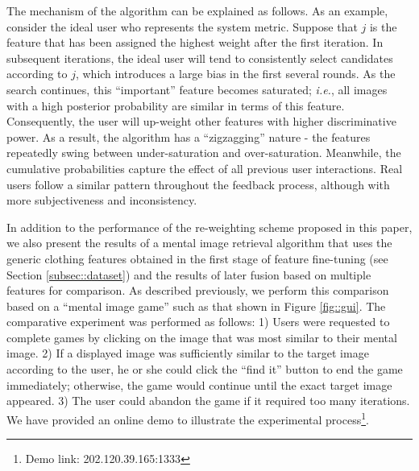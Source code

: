 \documentclass[journal]{IEEEtran}
\begin{document}
The mechanism of the algorithm can be explained as follows. As an example, consider the ideal user who represents the system metric. Suppose that $j$ is the feature that has been assigned the highest weight after the first iteration. In subsequent iterations, the ideal user will tend to consistently select candidates according to $j$, which introduces a large bias in the first several rounds. As the search continues, this ``important'' feature becomes saturated; \textit{i.e.}, all images with a high posterior probability are similar in terms of this feature. Consequently, the user will up-weight other features with higher discriminative power. As a result, the algorithm has a ``zigzagging'' nature - the features repeatedly swing between under-saturation and over-saturation. Meanwhile, the cumulative probabilities capture the effect of all previous user interactions. Real users follow a similar pattern throughout the feedback process, although with more subjectiveness and inconsistency.

In addition to the performance of the re-weighting scheme proposed in this paper, we also present the results of a mental image retrieval algorithm \cite{fang2005experiments} that uses the generic clothing features obtained in the first stage of feature fine-tuning (see Section \ref{subsec::dataset}) and the results of later fusion based on multiple features for comparison.
As described previously, we perform this comparison based on a ``mental image game'' such as that shown in Figure \ref{fig::gui}. The comparative experiment was performed as follows: 1) Users were requested to complete games by clicking on the image that was most similar to their mental image. 2) If a displayed image was sufficiently similar to the target image according to the user, he or she could click the ``find it'' button to end the game immediately; otherwise, the game would continue until the exact target image appeared. 3) The user could abandon the game if it required too many iterations. We have provided an online demo to illustrate the experimental process\footnote{Demo link: 202.120.39.165:1333}.
\end{document}
